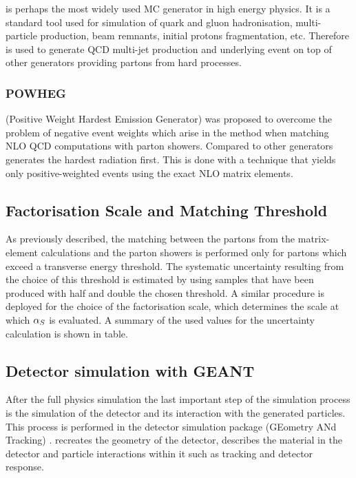 \PYTHIA \autocite{Pythia,Pythia6.4} is perhaps the most widely used MC generator in high energy physics. It is a
standard tool used for simulation of quark and gluon hadronisation, multi-particle production, beam remnants, initial
protons fragmentation, etc. Therefore \PYTHIA is used to generate QCD multi-jet production and underlying event on top
of other generators providing partons from hard processes.

\subsubsection*{POWHEG} 

\POWHEG (Positive Weight Hardest Emission Generator) \autocite{POWHEG} was proposed to overcome the problem of negative
event weights which arise in the \MCATNLO method when matching NLO QCD computations with parton showers. Compared to
other generators \POWHEG generates the hardest radiation first. This is done with a technique that yields only
positive-weighted events using the exact NLO matrix elements.

\subsection{Factorisation Scale and Matching Threshold}
\label{ss:factorisation_and_matching}

As previously described, the matching between the partons from the matrix-element calculations and the parton showers is
performed only for partons which exceed a transverse energy threshold. The systematic uncertainty resulting from the
choice of this threshold is estimated by using samples that have been produced with half and double the chosen
threshold. A similar procedure is deployed for the choice of the factorisation scale, which determines the scale at
which $\alpha_S$ is evaluated.
A summary of the used values for the uncertainty calculation is shown in table.


\subsection{Detector simulation with GEANT}
After the full physics simulation the last important step of the simulation process is the simulation of the detector
and its interaction with the generated particles. This process is performed in the detector simulation package
\GEANTfour (GEometry ANd Tracking) \autocite{GEANT4}. \GEANTfour recreates the geometry of the detector, describes the
material in the detector and particle interactions within it such as tracking and detector response.

